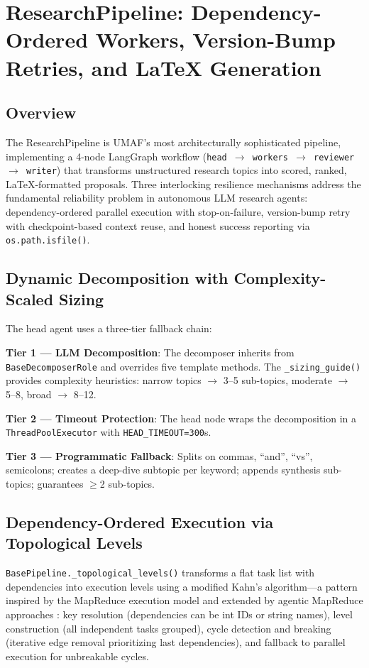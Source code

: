 \section{ResearchPipeline: Dependency-Ordered Workers, Version-Bump Retries, and LaTeX Generation}
\label{sec:research}

\subsection{Overview}

The ResearchPipeline is UMAF's most architecturally sophisticated pipeline, implementing a 4-node LangGraph workflow \cite{d3mas,paperorchestrator} (\texttt{head $\rightarrow$ workers $\rightarrow$ reviewer $\rightarrow$ writer}) that transforms unstructured research topics into scored, ranked, LaTeX-formatted proposals. Three interlocking resilience mechanisms address the fundamental reliability problem in autonomous LLM research agents: dependency-ordered parallel execution with stop-on-failure, version-bump retry with checkpoint-based context reuse, and honest success reporting via \texttt{os.path.isfile()}.

\subsection{Dynamic Decomposition with Complexity-Scaled Sizing}

The head agent uses a three-tier fallback chain:

\textbf{Tier 1 --- LLM Decomposition}: The decomposer inherits from \texttt{BaseDecomposerRole} and overrides five template methods. The \texttt{\_sizing\_guide()} provides complexity heuristics: narrow topics $\rightarrow$ 3--5 sub-topics, moderate $\rightarrow$ 5--8, broad $\rightarrow$ 8--12.

\textbf{Tier 2 --- Timeout Protection}: The head node wraps the decomposition in a \texttt{ThreadPoolExecutor} with \texttt{HEAD\_TIMEOUT=300}s.

\textbf{Tier 3 --- Programmatic Fallback}: Splits on commas, ``and'', ``vs'', semicolons; creates a deep-dive subtopic per keyword; appends synthesis sub-topics; guarantees $\ge$2 sub-topics.

\subsection{Dependency-Ordered Execution via Topological Levels}

\texttt{BasePipeline.\_topological\_levels()} transforms a flat task list with dependencies into execution levels using a modified Kahn's algorithm---a pattern inspired by the MapReduce execution model \cite{mapreduce} and extended by agentic MapReduce approaches \cite{amapreduce,llmmapreduce}: key resolution (dependencies can be int IDs or string names), level construction (all independent tasks grouped), cycle detection and breaking (iterative edge removal prioritizing last dependencies), and fallback to parallel execution for unbreakable cycles.

